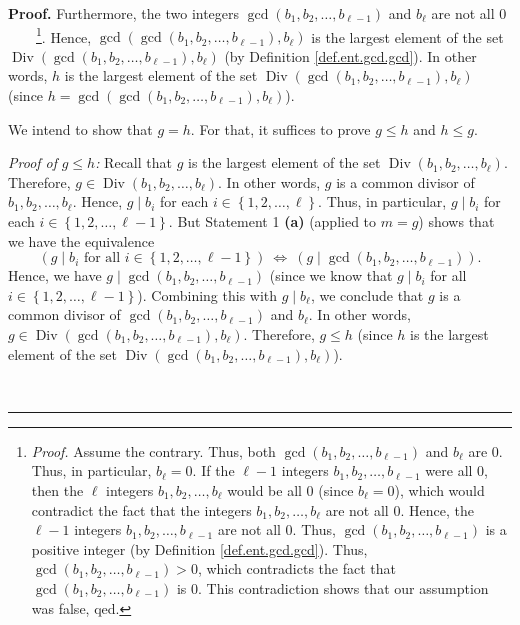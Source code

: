 \documentclass[numbers=enddot,12pt,final,onecolumn,notitlepage]{scrartcl}%
\numberwithin{exer}{subsection}
\theoremstyle{definition}
\newenvironment{proof}[1][Proof]{\noindent\textbf{#1.} }{\ \rule{0.5em}{0.5em}}
\begin{document}
\begin{proof}
Furthermore, the two integers $\gcd\left(  b_{1},b_{2},\ldots,b_{\ell
-1}\right)  $ and $b_{\ell}$ are not all $0$\ \ \ \ \footnote{\textit{Proof.}
Assume the contrary. Thus, both $\gcd\left(  b_{1},b_{2},\ldots,b_{\ell
-1}\right)  $ and $b_{\ell}$ are $0$. Thus, in particular, $b_{\ell}=0$. If
the $\ell-1$ integers $b_{1},b_{2},\ldots,b_{\ell-1}$ were all $0$, then the
$\ell$ integers $b_{1},b_{2},\ldots,b_{\ell}$ would be all $0$ (since
$b_{\ell}=0$), which would contradict the fact that the integers $b_{1}%
,b_{2},\ldots,b_{\ell}$ are not all $0$. Hence, the $\ell-1$ integers
$b_{1},b_{2},\ldots,b_{\ell-1}$ are not all $0$. Thus, $\gcd\left(
b_{1},b_{2},\ldots,b_{\ell-1}\right)  $ is a positive integer (by Definition
\ref{def.ent.gcd.gcd}). Thus, $\gcd\left(  b_{1},b_{2},\ldots,b_{\ell
-1}\right)  >0$, which contradicts the fact that $\gcd\left(  b_{1}%
,b_{2},\ldots,b_{\ell-1}\right)  $ is $0$. This contradiction shows that our
assumption was false, qed.}. Hence, $\gcd\left(  \gcd\left(  b_{1}%
,b_{2},\ldots,b_{\ell-1}\right)  ,b_{\ell}\right)  $ is the largest element of
the set \newline$\operatorname*{Div}\left(  \gcd\left(  b_{1},b_{2}%
,\ldots,b_{\ell-1}\right)  ,b_{\ell}\right)  $ (by Definition
\ref{def.ent.gcd.gcd}). In other words, $h$ is the largest element of the set
$\operatorname*{Div}\left(  \gcd\left(  b_{1},b_{2},\ldots,b_{\ell-1}\right)
,b_{\ell}\right)  $ (since $h=\gcd\left(  \gcd\left(  b_{1},b_{2}%
,\ldots,b_{\ell-1}\right)  ,b_{\ell}\right)  $).

We intend to show that $g=h$. For that, it suffices to prove $g\leq h$ and
$h\leq g$.

\textit{Proof of }$g\leq h$\textit{:} Recall that $g$ is the largest element
of the set $\operatorname*{Div}\left(  b_{1},b_{2},\ldots,b_{\ell}\right)  $.
Therefore, $g\in\operatorname*{Div}\left(  b_{1},b_{2},\ldots,b_{\ell}\right)
$. In other words, $g$ is a common divisor of $b_{1},b_{2},\ldots,b_{\ell}$.
Hence, $g\mid b_{i}$ for each $i\in\left\{  1,2,\ldots,\ell\right\}  $. Thus,
in particular, $g\mid b_{i}$ for each $i\in\left\{  1,2,\ldots,\ell-1\right\}
$. But Statement 1 \textbf{(a)} (applied to $m=g$) shows that we have the
equivalence%
\[
\left(  g\mid b_{i}\text{ for all }i\in\left\{  1,2,\ldots,\ell-1\right\}
\right)  \ \Longleftrightarrow\ \left(  g\mid\gcd\left(  b_{1},b_{2}%
,\ldots,b_{\ell-1}\right)  \right)  .
\]
Hence, we have $g\mid\gcd\left(  b_{1},b_{2},\ldots,b_{\ell-1}\right)  $
(since we know that $g\mid b_{i}$ for all $i\in\left\{  1,2,\ldots
,\ell-1\right\}  $). Combining this with $g\mid b_{\ell}$, we conclude that
$g$ is a common divisor of $\gcd\left(  b_{1},b_{2},\ldots,b_{\ell-1}\right)
$ and $b_{\ell}$. In other words, $g\in\operatorname*{Div}\left(  \gcd\left(
b_{1},b_{2},\ldots,b_{\ell-1}\right)  ,b_{\ell}\right)  $. Therefore, $g\leq
h$ (since $h$ is the largest element of the set $\operatorname*{Div}\left(
\gcd\left(  b_{1},b_{2},\ldots,b_{\ell-1}\right)  ,b_{\ell}\right)  $).


\end{proof}
\end{document}
